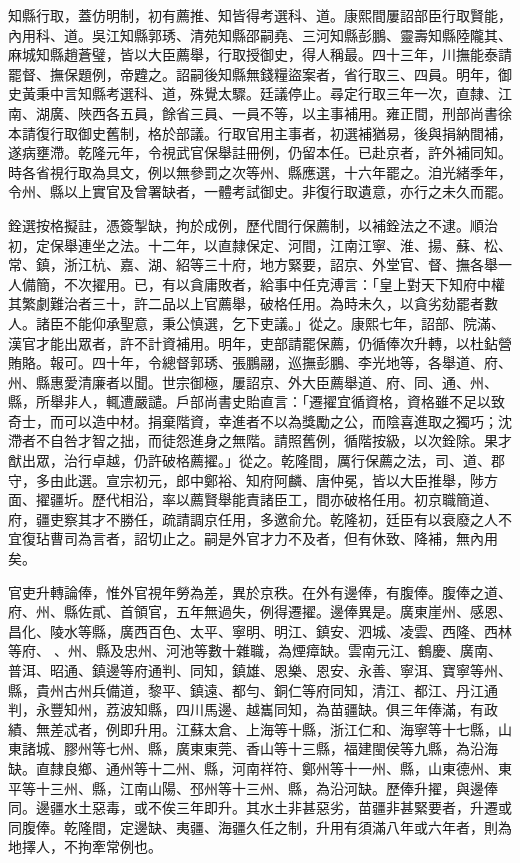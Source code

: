 \begin{pinyinscope}
知縣行取，蓋仿明制，初有薦推、知皆得考選科、道。康熙間屢詔部臣行取賢能，內用科、道。吳江知縣郭琇、清苑知縣邵嗣堯、三河知縣彭鵬、靈壽知縣陸隴其、麻城知縣趙蒼璧，皆以大臣薦舉，行取授御史，得人稱最。四十三年，川撫能泰請罷督、撫保題例，帝韙之。詔嗣後知縣無錢糧盜案者，省行取三、四員。明年，御史黃秉中言知縣考選科、道，殊覺太驟。廷議停止。尋定行取三年一次，直隸、江南、湖廣、陜西各五員，餘省三員、一員不等，以主事補用。雍正間，刑部尚書徐本請復行取御史舊制，格於部議。行取官用主事者，初選補猶易，後與捐納間補，遂病壅滯。乾隆元年，令視武官保舉註冊例，仍留本任。已赴京者，許外補同知。時各省視行取為具文，例以無參罰之次等州、縣應選，十六年罷之。洎光緒季年，令州、縣以上實官及曾署缺者，一體考試御史。非復行取遺意，亦行之未久而罷。

銓選按格擬註，憑簽掣缺，拘於成例，歷代間行保薦制，以補銓法之不逮。順治初，定保舉連坐之法。十二年，以直隸保定、河間，江南江寧、淮、揚、蘇、松、常、鎮，浙江杭、嘉、湖、紹等三十府，地方緊要，詔京、外堂官、督、撫各舉一人備簡，不次擢用。已，有以貪庸敗者，給事中任克溥言：「皇上對天下知府中權其繁劇難治者三十，許二品以上官薦舉，破格任用。為時未久，以貪劣劾罷者數人。諸臣不能仰承聖意，秉公慎選，乞下吏議。」從之。康熙七年，詔部、院滿、漢官才能出眾者，許不計資補用。明年，吏部請罷保薦，仍循俸次升轉，以杜鉆營賄賂。報可。四十年，令總督郭琇、張鵬翮，巡撫彭鵬、李光地等，各舉道、府、州、縣惠愛清廉者以聞。世宗御極，屢詔京、外大臣薦舉道、府、同、通、州、縣，所舉非人，輒遭嚴譴。戶部尚書史貽直言：「遷擢宜循資格，資格雖不足以致奇士，而可以造中材。捐棄階資，幸進者不以為獎勵之公，而陰喜進取之獨巧；沈滯者不自咎才智之拙，而徒怨進身之無階。請照舊例，循階按級，以次銓除。果才猷出眾，治行卓越，仍許破格薦擢。」從之。乾隆間，厲行保薦之法，司、道、郡守，多由此選。宣宗初元，郎中鄭裕、知府阿麟、唐仲冕，皆以大臣推舉，陟方面、擢疆圻。歷代相沿，率以薦賢舉能責諸臣工，間亦破格任用。初京職簡道、府，疆吏察其才不勝任，疏請調京任用，多邀俞允。乾隆初，廷臣有以衰廢之人不宜復玷曹司為言者，詔切止之。嗣是外官才力不及者，但有休致、降補，無內用矣。

官吏升轉論俸，惟外官視年勞為差，異於京秩。在外有邊俸，有腹俸。腹俸之道、府、州、縣佐貳、首領官，五年無過失，例得遷擢。邊俸異是。廣東崖州、感恩、昌化、陵水等縣，廣西百色、太平、寧明、明江、鎮安、泗城、凌雲、西隆、西林等府、、州、縣及忠州、河池等數十雜職，為煙瘴缺。雲南元江、鶴慶、廣南、普洱、昭通、鎮邊等府通判、同知，鎮雄、恩樂、恩安、永善、寧洱、寶寧等州、縣，貴州古州兵備道，黎平、鎮遠、都勻、銅仁等府同知，清江、都江、丹江通判，永豐知州，荔波知縣，四川馬邊、越巂同知，為苗疆缺。俱三年俸滿，有政績、無差忒者，例即升用。江蘇太倉、上海等十縣，浙江仁和、海寧等十七縣，山東諸城、膠州等七州、縣，廣東東莞、香山等十三縣，福建閩侯等九縣，為沿海缺。直隸良鄉、通州等十二州、縣，河南祥符、鄭州等十一州、縣，山東德州、東平等十三州、縣，江南山陽、邳州等十三州、縣，為沿河缺。歷俸升擢，與邊俸同。邊疆水土惡毒，或不俟三年即升。其水土非甚惡劣，苗疆非甚緊要者，升遷或同腹俸。乾隆間，定邊缺、夷疆、海疆久任之制，升用有須滿八年或六年者，則為地擇人，不拘牽常例也。


\end{pinyinscope}

